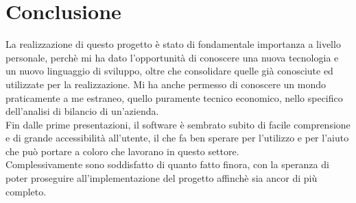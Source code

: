 \chapter*{Conclusione}

La realizzazione di questo progetto è stato di fondamentale importanza a livello personale, perchè mi ha dato l'opportunità di conoscere una nuova tecnologia e un nuovo linguaggio di sviluppo, oltre che consolidare quelle già conosciute ed utilizzate per la realizzazione.
Mi ha anche permesso di conoscere un mondo praticamente a me estraneo, quello puramente tecnico economico, nello specifico dell'analisi di bilancio di un'azienda.\\

Fin dalle prime presentazioni, il software è sembrato subito di facile comprensione e di grande accessibilità all'utente, il che fa ben sperare per l'utilizzo e per l'aiuto che può portare a coloro che lavorano in questo settore.\\

Complessivamente sono soddisfatto di quanto fatto finora, con la speranza di poter proseguire all'implementazione del progetto affinchè sia ancor di più completo.